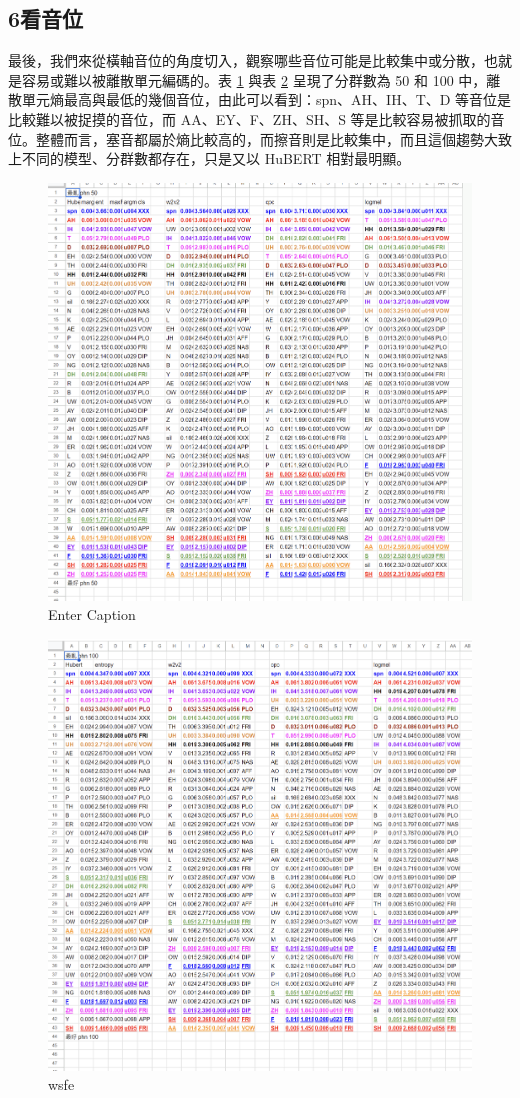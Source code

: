 \subsection{6看音位}

{
}




        最後，我們來從橫軸音位的角度切入，觀察哪些音位可能是比較集中或分散，也就是容易或難以被離散單元編碼的。表  \ref{fig:entefffffr-label} 與表 \ref{ewfeef} 呈現了分群數為 50 和 100 中，離散單元熵最高與最低的幾個音位，由此可以看到：spn、AH、IH、T、D 等音位是比較難以被捉摸的音位，而 AA、EY、F、ZH、SH、S 等是比較容易被抓取的音位。整體而言，塞音都屬於熵比較高的，而擦音則是比較集中，而且這個趨勢大致上不同的模型、分群數都存在，只是又以 HuBERT 相對最明顯。

\begin{figure}
    \centering
    \includegraphics[width=0.5\linewidth]{figures/aaaaaaaaaaaaaa.png}
    \caption{Enter Caption}
    \label{fig:entefffffr-label}
\end{figure}

\begin{figure}
    \centering
    \includegraphics[width=0.5\linewidth]{figures/asdfasdfsfasfaew.png}
    \caption{wsfe}
    \label{ewfeef}
\end{figure}

